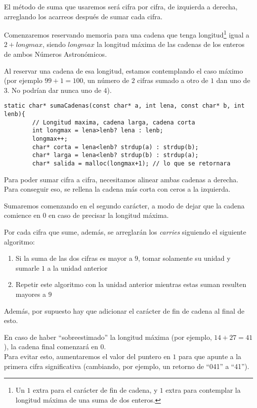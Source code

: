 \documentclass[a4paper, 12pt]{article}
\begin{document}
El método de suma que usaremos será cifra por cifra, de izquierda a derecha, arreglando los acarreos después de sumar cada cifra.

Comenzaremos reservando memoria para una cadena que tenga longitud\footnote{Un $1$ extra para el carácter de fin de cadena, y $1$ extra para contemplar la longitud máxima de una suma de dos enteros.} igual a $2+longmax$, siendo $longmax$ la longitud máxima de las cadenas de los enteros de ambos Números Astronómicos.

Al reservar una cadena de esa longitud, estamos contemplando el caso máximo (por ejemplo $99+1=100$, un número de $2$ cifras sumado a otro de $1$ dan uno de $3$. No podrían dar nunca uno de $4$).

\begin{lstlisting}[style=C]
    static char* sumaCadenas(const char* a, int lena, const char* b, int lenb){
        // Longitud maxima, cadena larga, cadena corta
        int longmax = lena>lenb? lena : lenb;
        longmax++;
        char* corta = lena<lenb? strdup(a) : strdup(b);
        char* larga = lena<lenb? strdup(b) : strdup(a);
        char* salida = malloc(longmax+1); // lo que se retornara
\end{lstlisting}

Para poder sumar cifra a cifra, necesitamos alinear ambas cadenas a derecha. Para conseguir eso, se rellena la cadena más corta con ceros a la izquierda.

Sumaremos comenzando en el segundo carácter, a modo de dejar que la cadena comience en $0$ en caso de precisar la longitud máxima.

Por cada cifra que sume, además, se arreglarán los \emph{carries} siguiendo el siguiente algoritmo:

\begin{enumerate}
    \item Si la suma de las dos cifras es mayor a $9$, tomar solamente su unidad y sumarle $1$ a la unidad anterior
    \item Repetir este algoritmo con la unidad anterior mientras estas suman resulten mayores a $9$
\end{enumerate}

Además, por supuesto hay que adicionar el carácter de fin de cadena al final de esto.

En caso de haber ``sobreestimado'' la longitud máxima (por ejemplo, $14+27=41$), la cadena final comenzará en $0$. \\
Para evitar esto, aumentaremos el valor del puntero en $1$ para que apunte a la primera cifra significativa (cambiando, por ejemplo, un retorno de ``041'' a ``41'').
\end{document}

